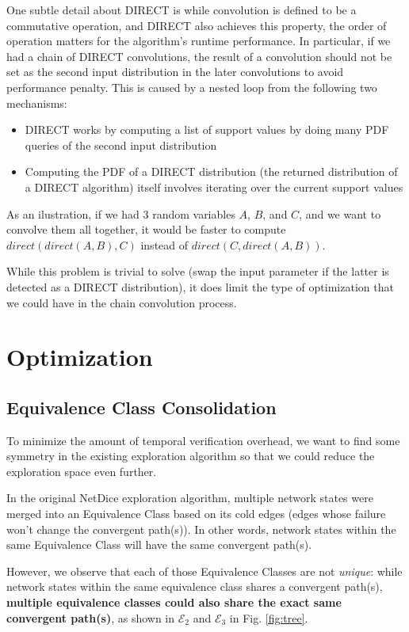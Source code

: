 One subtle detail about DIRECT is while convolution is defined to be a commutative operation, and 
DIRECT also achieves this property, the order of operation matters for the algorithm's runtime 
performance.
In particular, if we had a chain of DIRECT convolutions, the result of a convolution should not be set 
as the second input distribution in the later convolutions to avoid performance penalty.
This is caused by a nested loop from the following two mechanisms:
\begin{itemize}
    \item DIRECT works by computing a list of support values by doing many PDF queries of the second input
        distribution
    \item Computing the PDF of a DIRECT distribution (the returned distribution of a DIRECT 
        algorithm) itself involves iterating over the current support values
\end{itemize}

As an ilustration, if we had 3 random variables $A$, $B$, and  $C$, and we want 
to convolve them all together, it would be faster to compute $direct(direct(A, B), C)$ instead of 
$direct(C, direct(A, B))$.

While this problem is trivial to solve (swap the input parameter if the latter is detected as a 
DIRECT distribution), it does limit the type of optimization that we could have in the chain convolution 
process.

\section{Optimization} \label{sec:opt}
\subsection{Equivalence Class Consolidation}
To minimize the amount of temporal verification overhead, we want to find some symmetry in the 
existing exploration algorithm so that we could reduce the exploration space even further.

In the original NetDice exploration algorithm, multiple network states were merged into an Equivalence 
Class based on its cold edges (edges whose failure won't change the convergent path(s)).
In other words, network states within the same Equivalence Class will have the same convergent path(s).

However, we observe that each of those Equivalence Classes are not \textit{unique}: while network states within 
the same equivalence class shares a convergent path(s), \textbf{multiple equivalence classes could also 
share the exact same convergent path(s)}, as shown in $\mathcal{E}_2$ and $\mathcal{E}_3$ in Fig. \ref{fig:tree}.

